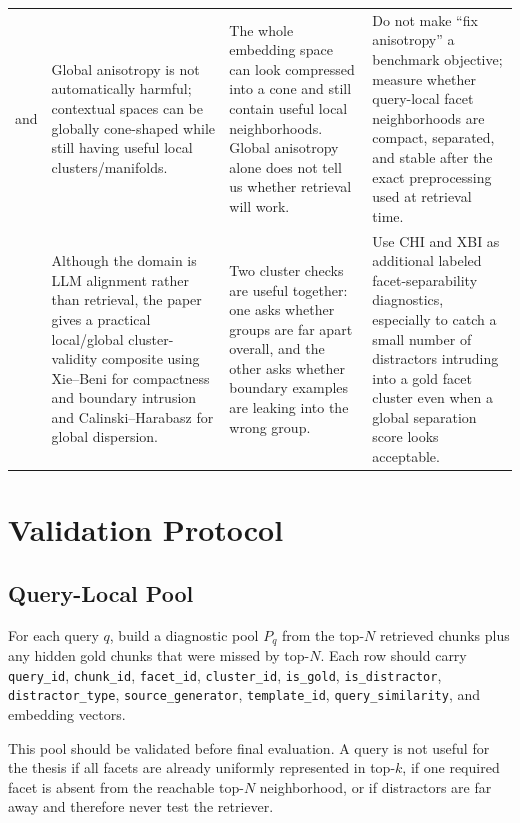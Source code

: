 \documentclass[11pt,a4paper]{article}
\newcommand{\field}[1]{\texttt{#1}}
\begin{document}
\begin{longtable}{@{}p{1.95cm}p{4.3cm}p{4.3cm}p{4.3cm}@{}}
	\citet{ait-saadaAnisotropyTrulyHarmful2023} and \citet{caiIsotropyContextualEmbedding2020} &  Global anisotropy is not automatically harmful; contextual spaces can be globally cone-shaped while still having useful local clusters/manifolds.  & The whole embedding space can look compressed into a cone and still contain useful local neighborhoods. Global anisotropy alone does not tell us whether retrieval will work. & Do not make ``fix anisotropy'' a benchmark objective; measure whether query-local facet neighborhoods are compact, separated, and stable after the exact preprocessing used at retrieval time. \\
	\citet{borahAlignmentQualityIndex2025} &  Although the domain is LLM alignment rather than retrieval, the paper gives a practical local/global cluster-validity composite using Xie--Beni for compactness and boundary intrusion and Calinski--Harabasz for global dispersion. & Two cluster checks are useful together: one asks whether groups are far apart overall, and the other asks whether boundary examples are leaking into the wrong group. & Use CHI and XBI as additional labeled facet-separability diagnostics, especially to catch a small number of distractors intruding into a gold facet cluster even when a global separation score looks acceptable. \\
\end{longtable}
\endgroup

\section{Validation Protocol}

\subsection{Query-Local Pool}

For each query $q$, build a diagnostic pool $P_q$ from the top-$N$ retrieved chunks plus any hidden gold chunks that were missed by top-$N$. Each row should carry \field{query\_id}, \field{chunk\_id}, \field{facet\_id}, \field{cluster\_id}, \field{is\_gold}, \field{is\_distractor}, \field{distractor\_type}, \field{source\_generator}, \field{template\_id}, \field{query\_similarity}, and embedding vectors.

This pool should be validated before final evaluation. A query is not useful for the thesis if all facets are already uniformly represented in top-$k$, if one required facet is absent from the reachable top-$N$ neighborhood, or if distractors are far away and therefore never test the retriever.
\end{document}
